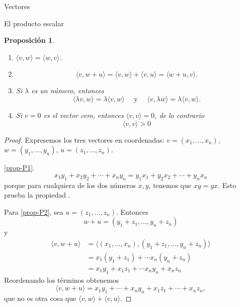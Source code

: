 \documentclass[a4paper,12pt,twoside,spanish,reqno]{amsbook}
\numberwithin{equation}{section}
\newtheorem{proposicion}[teorema]{Proposici\'on}
\theoremstyle{definition}
\theoremstyle{remark}
\begin{document}
\begin{chapter}{Vectores}
\begin{section}{El producto escalar}
\begin{proposicion}
        \begin{enumerate}[label=\textbf{P\arabic*.},ref=P\arabic*]
            \item\label{prop-P1}	$\langle v , w \rangle = \langle w , v \rangle$.
            \item\label{prop-P2} 
            \begin{equation*}
                \langle v , w + u \rangle =\langle v , w \rangle + \langle v , u \rangle = \langle w +u , v \rangle.
            \end{equation*}
            \item\label{prop-P3} Si $\lambda$ es un número, entonces 
            \begin{equation*}
                \langle \lambda v , w \rangle = \lambda \langle v , w \rangle \quad \text{ y } \quad  \langle v , \lambda w \rangle = \lambda \langle v , w \rangle.
            \end{equation*}
            \item\label{prop-P4} Si $v=0$ es el vector cero, entonces $\langle v , v \rangle =0$,  de lo contrario
            \begin{equation*}
                \langle v , v \rangle >0
            \end{equation*}
        \end{enumerate}
        \end{proposicion}
        \begin{proof} Expresemos los tres vectores en coordenadas:  $v = (x_1, \ldots,x_n)$, $w =  (y_1, \ldots, y_n)$, $u = (z_1, \ldots, z_n)$. 

            \ref{prop-P1}.
        \begin{equation*}
            x_1y_1 + x_2y_2+\cdots+x_ny_n = y_1x_1 + y_2x_2+\cdots+y_nx_n
        \end{equation*}
        porque para cualquiera de los dos números $x, y$, tenemos que $xy=yx$. Esto prueba la propiedad . 
        
        Para \ref{prop-P2}, sea $u = (z_1, \ldots, z_n)$. Entonces
        \begin{equation*}
            w + u = (y_1+z_1, \ldots, y_n+ z_n)
        \end{equation*}
        y
        \begin{align*}
            \langle v , w + u \rangle &= \langle (x_1, \ldots,x_n) , (y_1+z_1, \ldots, y_n+ z_n) \rangle\\
            &= x_1(y_1+z_1) + \cdots x_n(y_n+z_n) \\
            &= x_1y_1+x_1z_1 + \cdots x_ny_n+x_nz_n
        \end{align*}
        Reordenando los términos obtenemos
        \begin{equation*}
                \langle v , w + u \rangle =  x_1y_1+\cdots +  x_ny_n +x_1z_1 + \cdots+x_nz_n,
        \end{equation*}
        que no es otra cosa que $\langle v , w \rangle + \langle v , u \rangle$.
        

\end{proof}
\end{section}
\end{chapter}
\end{document}
